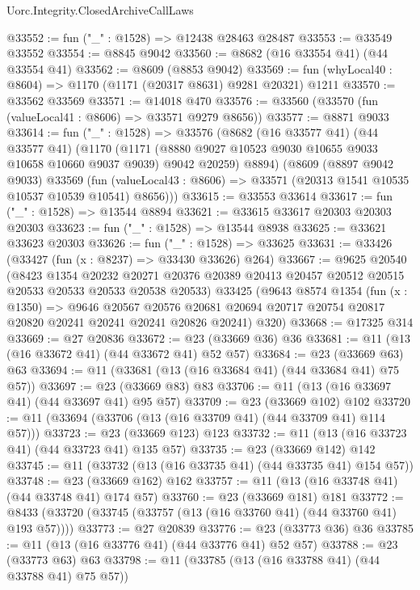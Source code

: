 \begin{lexlean}{Uorc.Integrity.ClosedArchiveCallLaws}
\begin{coremodule}
@33552 := fun ("_" : @1528) => @12438 @28463 @28487
@33553 := @33549 @33552
@33554 := @8845 @9042
@33560 := @8682 (@16 @33554 @41) (@44 @33554 @41)
@33562 := @8609 (@8853 @9042)
@33569 := fun (whyLocal40 : @8604) => @1170 (@1171 (@20317 @8631) @9281 @20321) @1211
@33570 := @33562 @33569
@33571 := @14018 @470
@33576 := @33560 (@33570 (fun (valueLocal41 : @8606) => @33571 @9279 @8656))
@33577 := @8871 @9033
@33614 := fun ("_" : @1528) =>
  @33576
    (@8682
      (@16 @33577 @41)
      (@44 @33577 @41)
      (@1170
        (@1171 (@8880 @9027 @10523 @9030 @10655 @9033 @10658 @10660 @9037 @9039) @9042 @20259)
        @8894)
      (@8609
        (@8897 @9042 @9033)
        @33569
        (fun (valueLocal43 : @8606) => @33571 (@20313 @1541 @10535 @10537 @10539 @10541) @8656)))
@33615 := @33553 @33614
@33617 := fun ("_" : @1528) => @13544 @8894
@33621 := @33615 @33617 @20303 @20303 @20303
@33623 := fun ("_" : @1528) => @13544 @8938
@33625 := @33621 @33623 @20303
@33626 := fun ("_" : @1528) => @33625
@33631 := @33426 (@33427 (fun (x : @8237) => @33430 @33626) @264)
@33667 := @9625
    @20540
    (@8423
      @1354
      @20232
      @20271
      @20376
      @20389
      @20413
      @20457
      @20512
      @20515
      @20533
      @20533
      @20533
      @20538
      @20533)
    @33425
    (@9643
      @8574
      @1354
      (fun (x : @1350) =>
      @9646
        @20567
        @20576
        @20681
        @20694
        @20717
        @20754
        @20817
        @20820
        @20241
        @20241
        @20241
        @20826
        @20241)
      @320)
@33668 := @17325 @314
@33669 := @27 @20836
@33672 := @23 (@33669 @36) @36
@33681 := @11 (@13 (@16 @33672 @41) (@44 @33672 @41) @52 @57)
@33684 := @23 (@33669 @63) @63
@33694 := @11 (@33681 (@13 (@16 @33684 @41) (@44 @33684 @41) @75 @57))
@33697 := @23 (@33669 @83) @83
@33706 := @11 (@13 (@16 @33697 @41) (@44 @33697 @41) @95 @57)
@33709 := @23 (@33669 @102) @102
@33720 := @11 (@33694 (@33706 (@13 (@16 @33709 @41) (@44 @33709 @41) @114 @57)))
@33723 := @23 (@33669 @123) @123
@33732 := @11 (@13 (@16 @33723 @41) (@44 @33723 @41) @135 @57)
@33735 := @23 (@33669 @142) @142
@33745 := @11 (@33732 (@13 (@16 @33735 @41) (@44 @33735 @41) @154 @57))
@33748 := @23 (@33669 @162) @162
@33757 := @11 (@13 (@16 @33748 @41) (@44 @33748 @41) @174 @57)
@33760 := @23 (@33669 @181) @181
@33772 := @8433 (@33720 (@33745 (@33757 (@13 (@16 @33760 @41) (@44 @33760 @41) @193 @57))))
@33773 := @27 @20839
@33776 := @23 (@33773 @36) @36
@33785 := @11 (@13 (@16 @33776 @41) (@44 @33776 @41) @52 @57)
@33788 := @23 (@33773 @63) @63
@33798 := @11 (@33785 (@13 (@16 @33788 @41) (@44 @33788 @41) @75 @57))

\end{coremodule}
\end{lexlean}

